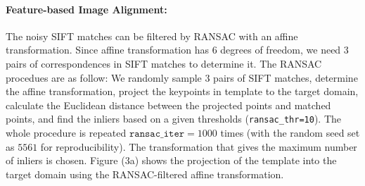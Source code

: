 \documentclass[11pt]{scrartcl}
\begin{document}
\begin{figure}[H]
	\captionsetup[subfigure]{labelformat=empty}
	\centering
	\label{fig:SIFT_match}
\end{figure}

\paragraph{\textbf{Feature-based Image Alignment:}} 
The noisy SIFT matches can be filtered by RANSAC with an affine transformation. Since affine transformation has $6$ degrees of freedom, we need $3$ pairs of correspondences in SIFT matches to determine it. The RANSAC procedues are as follow: We randomly sample $3$ pairs of SIFT matches, determine the affine transformation, project the keypoints in template to the target domain, calculate the Euclidean distance between the projected points and matched points, and find the inliers based on a given thresholds (\texttt{ransac\_thr=10}). The whole procedure is repeated $\texttt{ransac\_iter}=1000$ times (with the random seed set as $5561$ for reproducibility). The transformation that gives the maximum number of inliers is chosen. Figure (3a) shows the projection of the template into the target domain using the RANSAC-filtered affine transformation. 
\end{document}
